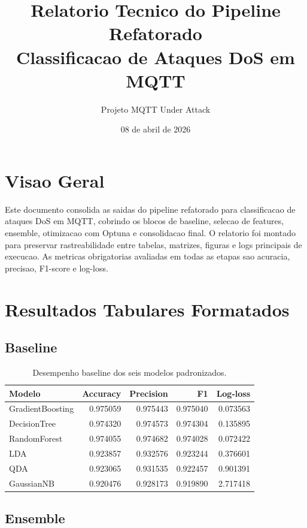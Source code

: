 \documentclass[12pt,a4paper]{article}
\title{Relatorio Tecnico do Pipeline Refatorado\\Classificacao de Ataques DoS em MQTT}
\author{Projeto MQTT Under Attack}
\date{08 de abril de 2026}
\begin{document}
\maketitle
\tableofcontents
\newpage

\section{Visao Geral}

Este documento consolida as saidas do pipeline refatorado para classificacao de ataques DoS em MQTT, cobrindo os blocos de baseline, selecao de features, ensemble, otimizacao com Optuna e consolidacao final. O relatorio foi montado para preservar rastreabilidade entre tabelas, matrizes, figuras e logs principais de execucao. As metricas obrigatorias avaliadas em todas as etapas sao acuracia, precisao, F1-score e log-loss.

\section{Resultados Tabulares Formatados}

\subsection{Baseline}

\begin{table}[H]
\centering
\caption{Desempenho baseline dos seis modelos padronizados.}
\begin{tabular}{lrrrr}
\toprule
Modelo & Accuracy & Precision & F1 & Log-loss \\
\midrule
GradientBoosting & 0.975059 & 0.975443 & 0.975040 & 0.073563 \\
DecisionTree & 0.974320 & 0.974573 & 0.974304 & 0.135895 \\
RandomForest & 0.974055 & 0.974682 & 0.974028 & 0.072422 \\
LDA & 0.923857 & 0.932576 & 0.923244 & 0.376601 \\
QDA & 0.923065 & 0.931535 & 0.922457 & 0.901391 \\
GaussianNB & 0.920476 & 0.928173 & 0.919890 & 2.717418 \\
\bottomrule
\end{tabular}
\end{table}

\subsection{Ensemble}
\end{document}
